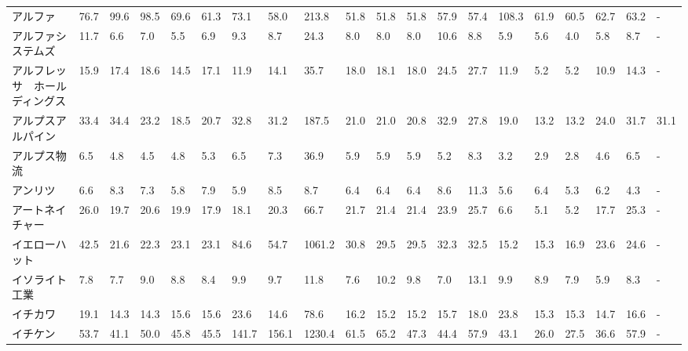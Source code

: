 \begin{longtable}[c]{lp{3mm}p{3mm}p{3mm}p{3mm}p{3mm}p{3mm}p{3mm}p{3mm}p{3mm}p{3mm}p{3mm}p{3mm}p{3mm}p{3mm}p{3mm}p{3mm}p{3mm}p{3mm}p{3mm}}
アルファ            &   76.7 &   99.6 &      98.5 &      69.6 &       61.3 &    73.1 &    58.0 &    213.8 &    51.8 &    51.8 &   51.8 &   57.9 &    57.4 &   108.3 &    61.9 &   60.5 &   62.7 &    63.2 &      - \\
アルファシステムズ       &   11.7 &    6.6 &       7.0 &       5.5 &        6.9 &     9.3 &     8.7 &     24.3 &     8.0 &     8.0 &    8.0 &   10.6 &     8.8 &     5.9 &     5.6 &    4.0 &    5.8 &     8.7 &      - \\
アルフレッサ　ホールディングス &   15.9 &   17.4 &      18.6 &      14.5 &       17.1 &    11.9 &    14.1 &     35.7 &    18.0 &    18.1 &   18.0 &   24.5 &    27.7 &    11.9 &     5.2 &    5.2 &   10.9 &    14.3 &      - \\
アルプスアルパイン       &   33.4 &   34.4 &      23.2 &      18.5 &       20.7 &    32.8 &    31.2 &    187.5 &    21.0 &    21.0 &   20.8 &   32.9 &    27.8 &    19.0 &    13.2 &   13.2 &   24.0 &    31.7 &   31.1 \\
アルプス物流          &    6.5 &    4.8 &       4.5 &       4.8 &        5.3 &     6.5 &     7.3 &     36.9 &     5.9 &     5.9 &    5.9 &    5.2 &     8.3 &     3.2 &     2.9 &    2.8 &    4.6 &     6.5 &      - \\
アンリツ            &    6.6 &    8.3 &       7.3 &       5.8 &        7.9 &     5.9 &     8.5 &      8.7 &     6.4 &     6.4 &    6.4 &    8.6 &    11.3 &     5.6 &     6.4 &    5.3 &    6.2 &     4.3 &      - \\
アートネイチャー        &   26.0 &   19.7 &      20.6 &      19.9 &       17.9 &    18.1 &    20.3 &     66.7 &    21.7 &    21.4 &   21.4 &   23.9 &    25.7 &     6.6 &     5.1 &    5.2 &   17.7 &    25.3 &      - \\
イエローハット         &   42.5 &   21.6 &      22.3 &      23.1 &       23.1 &    84.6 &    54.7 &   1061.2 &    30.8 &    29.5 &   29.5 &   32.3 &    32.5 &    15.2 &    15.3 &   16.9 &   23.6 &    24.6 &      - \\
イソライト工業         &    7.8 &    7.7 &       9.0 &       8.8 &        8.4 &     9.9 &     9.7 &     11.8 &     7.6 &    10.2 &    9.8 &    7.0 &    13.1 &     9.9 &     8.9 &    7.9 &    5.9 &     8.3 &      - \\
イチカワ            &   19.1 &   14.3 &      14.3 &      15.6 &       15.6 &    23.6 &    14.6 &     78.6 &    16.2 &    15.2 &   15.2 &   15.7 &    18.0 &    23.8 &    15.3 &   15.3 &   14.7 &    16.6 &      - \\
イチケン            &   53.7 &   41.1 &      50.0 &      45.8 &       45.5 &   141.7 &   156.1 &   1230.4 &    61.5 &    65.2 &   47.3 &   44.4 &    57.9 &    43.1 &    26.0 &   27.5 &   36.6 &    57.9 &      - \\

\end{longtable}
